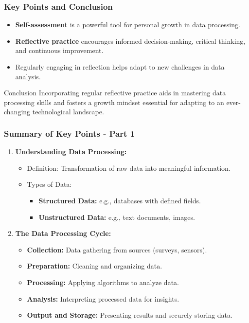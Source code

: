 \documentclass[aspectratio=169]{beamer}
\begin{document}
\begin{frame}[fragile]
    \frametitle{Key Points and Conclusion}
    \begin{itemize}
        \item \textbf{Self-assessment} is a powerful tool for personal growth in data processing.
        \item \textbf{Reflective practice} encourages informed decision-making, critical thinking, and continuous improvement.
        \item Regularly engaging in reflection helps adapt to new challenges in data analysis.
    \end{itemize}
    
    \begin{block}{Conclusion}
        Incorporating regular reflective practice aids in mastering data processing skills and fosters a growth mindset essential for adapting to an ever-changing technological landscape.
    \end{block}
\end{frame}

\begin{frame}[fragile]
    \frametitle{Summary of Key Points - Part 1}
    
    \begin{enumerate}
        \item \textbf{Understanding Data Processing:}
        \begin{itemize}
            \item Definition: Transformation of raw data into meaningful information.
            \item Types of Data:
            \begin{itemize}
                \item \textbf{Structured Data:} e.g., databases with defined fields.
                \item \textbf{Unstructured Data:} e.g., text documents, images.
            \end{itemize}
        \end{itemize}
        
        \item \textbf{The Data Processing Cycle:}
        \begin{itemize}
            \item \textbf{Collection:} Data gathering from sources (surveys, sensors).
            \item \textbf{Preparation:} Cleaning and organizing data.
            \item \textbf{Processing:} Applying algorithms to analyze data.
            \item \textbf{Analysis:} Interpreting processed data for insights.
            \item \textbf{Output and Storage:} Presenting results and securely storing data.
        \end{itemize}
    \end{enumerate}
\end{frame}
\end{document}
